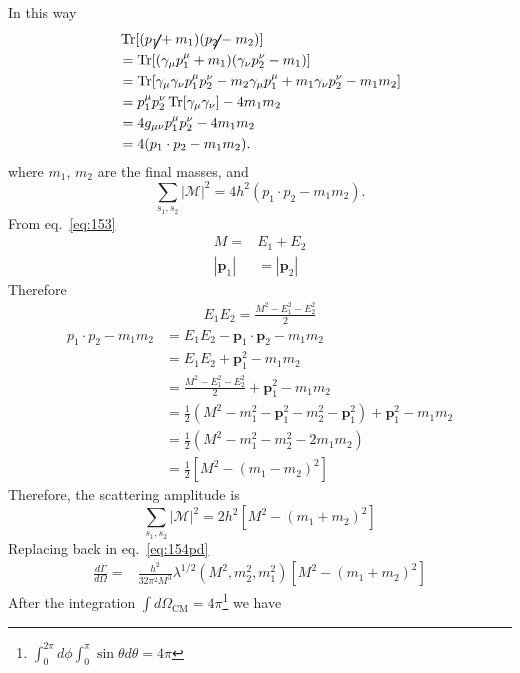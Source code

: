 In this way
\begin{align*}
&\operatorname{Tr}[(\cancel{p}_{1}+m_{1})(\cancel{p}_{2}-m_{2})]\\
&=\operatorname{Tr}[(\gamma_{\mu}p^{\mu}_{1}+m_{1})(\gamma_{\nu}p^{\nu}_{2}-m_{1})]\\
&=\operatorname{Tr}[\gamma_{\mu}\gamma_{\nu}p^{\mu}_{1}p^{\nu}_{2}-m_{2}\gamma_{\mu}p^{\mu}_{1}+m_{1}\gamma_{\nu}p^{\nu}_{2}-m_{1}m_2]\\
&=p^{\mu}_{1}p^{\nu}_{2}\operatorname{Tr}[\gamma_{\mu}\gamma_{\nu}]-4m_1 m_2\\
&=4g_{\mu\nu}p^{\mu}_{1}p^{\nu}_{2}-4m_1m_2\\
&=4(p_{1}\cdot p_{2}-m_1m_2). 
\end{align*}
where  $m_1$, $m_2$ are the final masses, and
\begin{equation*}
\sum_{s_1,s_2}|\mathcal{M}|^{2}=4h^2(p_{1}\cdot p_{2}-m_{1}m_2).
\end{equation*}
From eq.~\eqref{eq:153}
\begin{align}
  M=&E_1+E_2\nonumber\\
|\mathbf{p}_1|&=|\mathbf{p}_2|
\end{align}
Therefore
\begin{align}
  E_1E_2=\frac{M^2-E_1^2-E_2^2}{2}
\end{align}
\begin{align*}
  p_{1}\cdot p_{2}-m_1 m_2&=E_{1}E_{2}-\mathbf{p}_{1}\cdot\mathbf{p}_{2}-m_1 m_2\\
&=E_{1}E_{2}+\mathbf{p}_{1}^2-m_1 m_2\\
&=\frac{M^2-E_1^2-E_2^2}{2}+\mathbf{p}_{1}^2-m_1 m_2\nonumber\\
&=\frac12\left(M^2-m_1^2-\mathbf{p}_1^2-m_2^2-\mathbf{p}_1^2\right)+\mathbf{p}_{1}^2-m_1 m_2\\
&=\frac12\left(M^2-m_1^2-m_2^2-2m_1m_2\right)\\
&=\frac12\left[M^2-(m_1-m_2)^2\right]
\end{align*}
Therefore, the scattering  amplitude is
\begin{equation}
\sum_{s_1,s_2}|\mathcal{M}|^{2}=2h^2\left[M^2-(m_1+m_2)^2\right]
\label{eq:82}
\end{equation}
Replacing back in eq.~\eqref{eq:154pd}
\begin{align}
\frac{d\Gamma}{d\Omega}=
&\frac{h^2}{32 \pi^2M^3}\lambda^{1/2}(M^2,m_2^2,m_1^2)\left[M^2-(m_1+m_2)^2\right]
\end{align}
After the integration $\int d\Omega_{\text{CM}}=4\pi$\footnote{$\int_0^{2\pi}d\phi\int_0^\pi\sin\theta d\theta=4\pi $} we have

